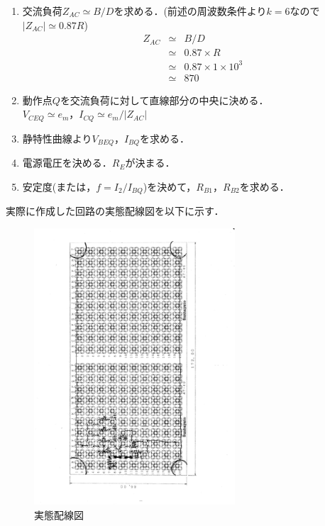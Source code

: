 \documentclass[10pt, a4j, dvipdfmx]{jarticle}
\makeatletter
\newcommand{\figcaption}[1]{\def\@captype{figure}\caption{#1}}
\makeatother
\begin{document}
\begin{enumerate}
        \item 交流負荷$Z_{AC} \simeq B/D$を求める．(前述の周波数条件より$k = 6$なので$|Z_{AC}| \simeq 0.87R$)\\
                \begin{eqnarray*}
                    Z_{AC} & \simeq & B/D \\
                    & \simeq & 0.87 \times R \\
                    & \simeq & 0.87 \times 1 \times 10^3 \\
                    & \simeq & 870
                \end{eqnarray*}
        \item 動作点$Q$を交流負荷に対して直線部分の中央に決める．\\
              $V_{CEQ} \simeq e_m$，$I_{CQ} \simeq e_m/|Z_{AC}|$ \\
        \item 静特性曲線より$V_{BEQ}$，$I_{BQ}$を求める．
        \item 電源電圧を決める．$R_E$が決まる．
        \item 安定度(または，$f = I_2/I_{BQ}$)を決めて，$R_{B1}$，$R_{B2}$を求める．
      \end{enumerate}
      実際に作成した回路の実態配線図を以下に示す．
      \begin{figure}[H]
        \centering
        \includegraphics[width=75mm, angle=-90]{circuit.png}
        \figcaption{実態配線図}
      \end{figure}
\end{document}
